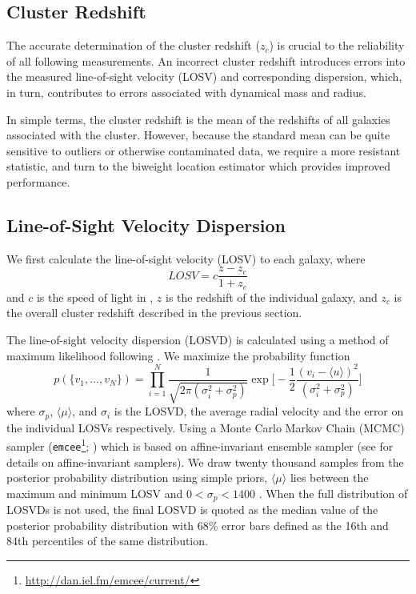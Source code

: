 \documentclass[fleqn,usenatbib]{mnras}
\begin{document}
\subsection{Cluster Redshift}
The accurate determination of the cluster redshift ($z_c$) is crucial to the reliability of all following measurements. An incorrect cluster redshift introduces errors into the measured line-of-sight velocity (LOSV) and corresponding dispersion, which, in turn, contributes to errors associated with dynamical mass and radius. 

In simple terms, the cluster redshift is the mean of the redshifts of all galaxies associated with the cluster. However, because the standard mean can be quite sensitive to outliers or otherwise contaminated data, we require a more resistant statistic, and turn to the biweight location estimator \citep{Beers1990} which provides improved performance. 

\subsection{Line-of-Sight Velocity Dispersion}\label{sec: LOSVD}
We first calculate the line-of-sight velocity (LOSV) to each galaxy, where
\begin{equation}
	LOSV = c\frac{z - z_c}{1+z_c}
\end{equation}
and $c$ is the speed of light in \kms, $z$ is the redshift of the individual galaxy, and $z_c$ is the overall cluster redshift described in the previous section.

The line-of-sight velocity dispersion (LOSVD) is calculated using a method of maximum likelihood following \cite{Walker2006}. We maximize the probability function 
\begin{equation}\label{eq: jointGaussian}
p(\{v_1, ..., v_N\})=\displaystyle\prod_{i=1}^{N}\frac{1}{\sqrt{2\pi(\sigma_i^2+\sigma_p^2)}}\exp\biggl[-\frac{1}{2}\frac{(v_i-\langle u \rangle)^2}{(\sigma_i^2+\sigma_p^2)}\biggr]
\end{equation}
where $\sigma_p$, $\langle\mu\rangle$, and $\sigma_i$ is the LOSVD, the average radial velocity and the error on the individual LOSVs respectively. Using a Monte Carlo Markov Chain (MCMC) sampler ({\tt emcee}\footnote{\url{http://dan.iel.fm/emcee/current/}}; \citealt{Foreman-Mackey2013}) which is based on affine-invariant ensemble sampler (see \citealt{Goodman2010} for details on affine-invariant samplers). We draw twenty thousand samples from the posterior probability distribution using simple priors, $\langle\mu\rangle$ lies between the maximum and minimum LOSV and $0< \sigma_p < 1400$ \kms. When the full distribution of LOSVDs is not used, the final LOSVD is quoted as the median value of the posterior probability distribution with 68\% error bars defined as the 16th and 84th percentiles of the same distribution.
\end{document}
